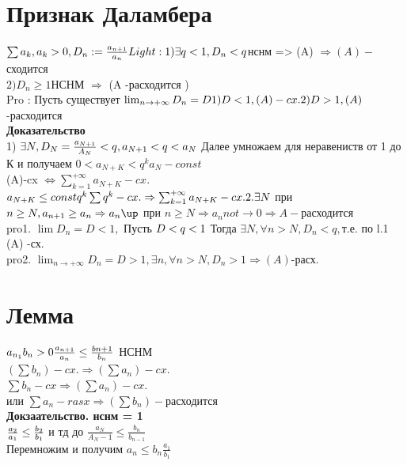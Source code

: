 \documentclass[12pt, a4paper]{article}
\begin{document}
	\section{Признак Даламбера}
	$ \sum a_k , a_k > 0, D_n := \frac{a_{n+1}}{a_n}\\
	Light: 1) \exists q<1, D_n < q  $нснм => (A) $  \Rightarrow (A)- $сходится \\
	$ 2) D_n \geq 1  $НСНМ $\Rightarrow$ (A -расходится )\\
	Pro : Пусть существует $ \lim_{n \rightarrow +\infty} D_n =D \\
	1)  D < 1 , (A) -cx. \\
	2) D >1 , (A) $-расходится \\
	\textbf{Доказательство} \\
	1) $ \exists N, D_N =\frac{a_{N+1}}{A_N} < q,
	\\ a_{N+1} < q< a_N $ Далее умножаем  для неравениств от 1 до К и получаем $0<a_{N+K} < q^k  a_N - const$\\
	(A)-cx $ \Leftrightarrow \sum_{k=1}^{+\infty} a_{N+K}- cx. $\\
	$ a_{N+K} \leq const q^k \\
	\sum q^k -cx. \Rightarrow \sum_{k=1}^{+\infty} a_{N+K}- cx. \\
	2. \exists N  $ при $ n \geq N, a_{n+1} \geq a_n \\
	\Rightarrow a_n \up  $ при $ n \geq N \Rightarrow a_n  not \rightarrow 0 \Rightarrow A- $расходится \\
	
	pro1. $ \lim D_n= D < 1 , $ Пусть $ D< q < 1 \\ $
	Тогда $ \exists N, \forall n > N , D_n < q,  $т.е. по l.1  (A) -сх. \\
	pro2. $ \lim_{n \rightarrow +\infty}D_n =D > 1,  \exists n , \forall n  > N, D_n > 1 \Rightarrow(A) $-расх.\\
	
	\section{Лемма}
	$ a_{n_1} b_n>0 \\
	\frac{a_{n+1}}{a_n} \leq \frac{b{n+1}}{b_n}$ НСНМ \\
	$ (\sum b_n) -cx. \Rightarrow (\sum a_n )- cx. $\\
	
	$ \sum b_n -cx \Rightarrow (\sum a_n)-cx.$\\
	или
	$ \sum a_n -rasx \Rightarrow (\sum b_n)-$расходится\\
	\textbf{Докзаательство. нснм = 1}\\
	$ \frac{a_2}{a_1} \leq \frac{b_2}{b_1}\\$ и тд до $ \frac{a_N}{A_N-1} \leq \frac{b_n}{b_{n-1}}$ \\ Перемножим и получим $a_n \leq b_n \frac{a_1}{b_1}$\\
\end{document}
